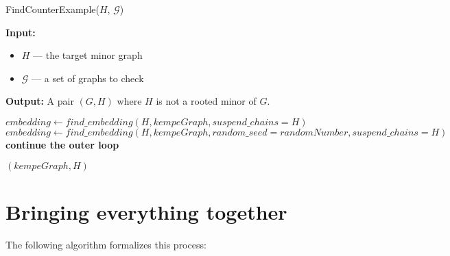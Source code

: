 \begin{algorithm}[H]
    \caption{FindCounterExample($H$, $\mathcal{G}$)}
    \begin{algorithmic}[1]
        \Statex \textbf{Input:} 
        \begin{itemize}
            \item \( H \) — the target minor graph
            \item \( \mathcal{G} \) — a set of graphs to check
        \end{itemize}
        \Statex \textbf{Output:} A pair \( (G, H) \) where \( H \) is not a rooted minor of $G$.

            \State $embedding \gets find\_embedding(H, kempeGraph, suspend\_chains = H)$
                    \State $embedding \gets find\_embedding(H, kempeGraph, random\_seed = randomNumber, suspend\_chains = H)$
                        \State \textbf{continue the outer loop} 
                    \EndIf
                \EndFor
                
                \State \Return  $(kempeGraph, H)$ 
            \EndIf
        \EndFor
    \end{algorithmic}
\end{algorithm}

\section{Bringing everything together}

The following algorithm formalizes this process:

